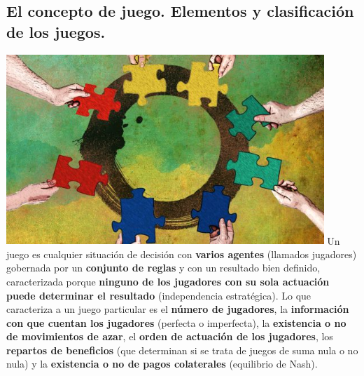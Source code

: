 \subsection{El concepto de juego. Elementos y clasificación de los juegos.}
		    \centering \includegraphics[width=0.9\textwidth]{juegos.jpg}
Un juego es cualquier situación de decisión con \textbf{varios agentes} (llamados jugadores) gobernada por un \textbf{conjunto de reglas} y con un resultado bien definido, caracterizada porque \textbf{ninguno de los jugadores con su sola actuación puede determinar el resultado} (independencia estratégica).
Lo que caracteriza a un juego particular es el \textbf{número de jugadores}, la \textbf{información con que cuentan los jugadores} (perfecta o imperfecta), la \textbf{existencia o no de movimientos de azar}, el \textbf{orden de actuación de los jugadores}, los \textbf{repartos de beneficios} (que determinan si se trata de juegos de suma nula o no nula) y la \textbf{existencia o no de pagos colaterales} (equilibrio de Nash).
